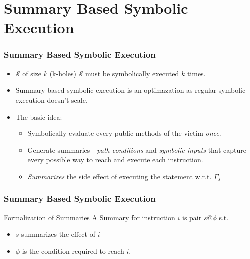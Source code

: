 \documentclass{beamer}
\begin{document}
\section{Summary Based Symbolic Execution}
\begin{frame}
  \frametitle{Summary Based Symbolic Execution}
  \begin{itemize}
    \item $\mathcal{S}$ of size $k$ (k-holes)
      $\mathcal{S}$ must be symbolically executed $k$ times.
    \item Summary based symbolic execution is an optimazation
      as regular symbolic execution doesn't scale.
    \item The basic idea:
      \begin{itemize}
        \item Symbolically evaluate every public methods of
          the victim \textit{once}.
        \item Generate summaries - \textit{path conditions} and
          \textit{symbolic inputs} that capture every possible
          way to reach and execute each instruction.
        \item \textit{Summarizes} the side effect
          of executing the statement w.r.t. $\Gamma_s$
       \end{itemize}
      \end{itemize}
\end{frame}

\begin{frame}
  \frametitle{Summary Based Symbolic Execution}
  \begin{block}{Formalization of Summaries}
    A Summary for instruction $i$ is pair $s@\phi$ s.t.
    \begin{itemize}
      \item $s$ summarizes the effect of $i$
      \item $\phi$ is the condition required to reach $i$.
    \end{itemize}
  \end{block}
\end{frame}
\end{document}
